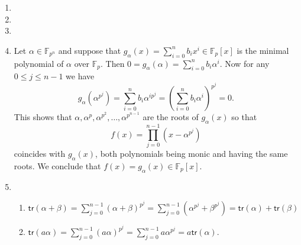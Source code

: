 \documentclass[12pt]{article}
\begin{document}
\begin{enumerate}
\item %
\item %
\item %
\item %
Let $\alpha\in\mathbb{F}_{p^n}$
and suppose that $g_\alpha\left(x\right)
=\sum_{i=0}^nb_ix^i\in\mathbb{F}_p\left[x\right]$
is the minimal polynomial of $\alpha$ over $\mathbb{F}_p$.
Then $0=g_\alpha\left(\alpha\right)=\sum_{i=0}^nb_i\alpha^i$.
Now for any $0\le j\le n-1$ we have
\[g_\alpha\left(\alpha^{p^j}\right)
=\sum_{i=0}^nb_i\alpha^{ip^j}
=\left(\sum_{i=0}^nb_i\alpha^i\right)^{p^j}=0.\]
This shows that $\alpha,\alpha^p,\alpha^{p^2},\ldots,\alpha^{p^{n-1}}$
are the roots of $g_\alpha\left(x\right)$ so that
\[f\left(x\right)=\prod_{j=0}^{n-1}\left(x-\alpha^{p^j}\right)\]
coincides with $g_\alpha\left(x\right)$, both
polynomials being monic and having the same roots.
We conclude that
$f\left(x\right)=g_\alpha\left(x\right)
\in\mathbb{F}_p\left[x\right]$.

\item %
\begin{enumerate}
\item $\mathsf{tr}\left(\alpha+\beta\right)
=\sum_{j=0}^{n-1}\left(\alpha+\beta\right)^{p^j}
=\sum_{j=0}^{n-1}\left(\alpha^{p^j}+\beta^{p^j}\right)
=\mathsf{tr}\left(\alpha\right)+\mathsf{tr}\left(\beta\right)$
\item $\mathsf{tr}\left(a\alpha\right)
=\sum_{j=0}^{n-1}\left(a\alpha\right)^{p^j}
=\sum_{j=0}^{n-1}a\alpha^{p^j}=a\mathsf{tr}\left(\alpha\right)$.
\end{enumerate}

\end{enumerate}
\end{document}
